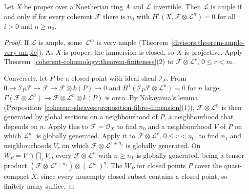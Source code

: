 \begin{theorem}\label{divisors:theorem-cohomological-ampleness}
Let $X$ be proper over a Noetherian ring $A$ and $\mathcal{L}$ invertible. Then $\mathcal{L}$ is ample if and only if for every coherent $\mathcal{F}$ there is $n_0$ with
$H^i(X, \mathcal{F} \otimes \mathcal{L}^n) = 0$ for all $i > 0$ and $n \geq n_0$.
\end{theorem}

\begin{proof}
If $\mathcal{L}$ is ample, some $\mathcal{L}^m$ is very ample (Theorem~\ref{divisors:theorem-ample-very-ample}). As $X$ is proper, the immersion is closed, so $X$ is
projective. Apply Theorem~\ref{coherent-cohomology:theorem-finiteness}(2) to $\mathcal{F} \otimes \mathcal{L}^r$, $0 \leq r < m$.

Conversely, let $P$ be a closed point with ideal sheaf $\mathcal{I}_P$. From $0 \to \mathcal{I}_P\mathcal{F} \to \mathcal{F} \to \mathcal{F} \otimes k(P) \to 0$ and
$H^1(\mathcal{I}_P\mathcal{F} \otimes \mathcal{L}^n) = 0$ for $n$ large, $\Gamma(\mathcal{F} \otimes \mathcal{L}^n) \to \mathcal{F} \otimes \mathcal{L}^n \otimes k(P)$ is onto. By Nakayama's lemma
(Proposition~\ref{coherent-sheaves:proposition-fibre-dimension}(1)), $\mathcal{F} \otimes \mathcal{L}^n$ is then generated by global sections on a neighbourhood of $P$,
a neighbourhood that depends on $n$. Apply this to $\mathcal{F} = \mathcal{O}_X$ to find $n_0$ and a neighbourhood $V$ of $P$ on which $\mathcal{L}^{n_0}$ is globally
generated. Apply it to $\mathcal{F} \otimes \mathcal{L}^r$, $0 \leq r < n_0$, to find $n_1$ and neighbourhoods $V_r$ on which $\mathcal{F} \otimes \mathcal{L}^{r + n_1}$ is globally
generated. On $W_P = V \cap \bigcap_rV_r$, every $\mathcal{F} \otimes \mathcal{L}^n$ with $n \geq n_1$ is globally generated, being a tensor product
$(\mathcal{F} \otimes \mathcal{L}^{r + n_1}) \otimes (\mathcal{L}^{n_0})^{q}$. The $W_P$ for closed points $P$ cover the quasi-compact $X$, since every nonempty closed
subset contains a closed point, so finitely many suffice.
\end{proof}

